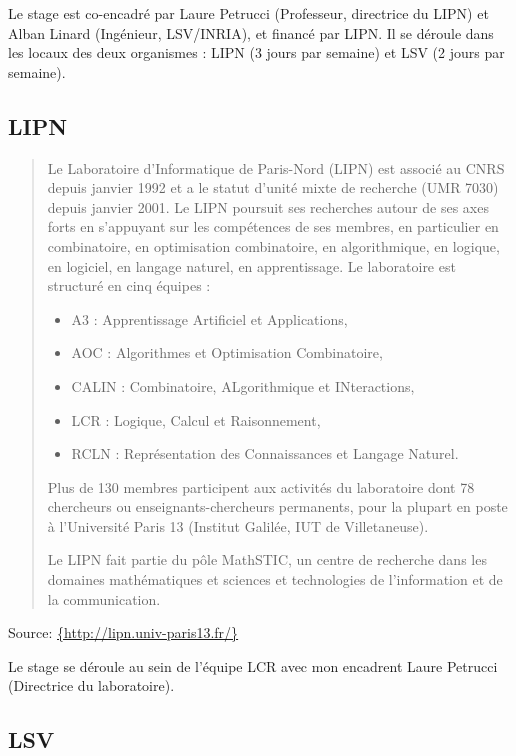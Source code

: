 \documentclass{report}
\begin{document}
Le stage est co-encadré par Laure Petrucci (Professeur, directrice du LIPN)
et Alban Linard (Ingénieur, LSV/INRIA), et financé par LIPN. Il se déroule
dans les locaux des deux organismes : LIPN (3 jours par semaine) et LSV (2 jours par semaine).

\subsection{LIPN}

\begin{quotation}
Le Laboratoire d'Informatique de Paris-Nord (LIPN) est associé au CNRS depuis janvier 1992 et a le statut d'unité mixte 
de recherche  (UMR 7030) depuis janvier 2001. Le LIPN poursuit ses recherches autour de ses axes forts en s'appuyant 
sur les compétences de ses membres, en particulier en combinatoire, en optimisation combinatoire, en algorithmique, 
en logique, en logiciel, en langage naturel, en apprentissage. Le laboratoire est structuré en cinq équipes :\\
\begin{itemize}
     \item A3 : Apprentissage Artificiel et Applications,
     \item AOC : Algorithmes et Optimisation Combinatoire,
     \item CALIN : Combinatoire, ALgorithmique et INteractions,
     \item LCR : Logique, Calcul et Raisonnement,
     \item RCLN : Représentation des Connaissances et Langage Naturel. 
\end{itemize}

Plus de 130 membres participent aux activités du laboratoire dont 78 chercheurs ou enseignants-chercheurs permanents, 
pour la plupart en poste à l'Université Paris 13 (Institut Galilée, IUT de Villetaneuse).
    
Le LIPN fait partie du pôle MathSTIC, un centre de recherche dans les domaines mathématiques et sciences et 
technologies de l'information et de la communication.
\end{quotation}
\hfill{Source: \url{{http://lipn.univ-paris13.fr/}}}

\medskip

Le stage se déroule au sein de l'équipe LCR avec mon encadrent Laure Petrucci (Directrice du laboratoire).

\subsection{LSV}
\end{document}

